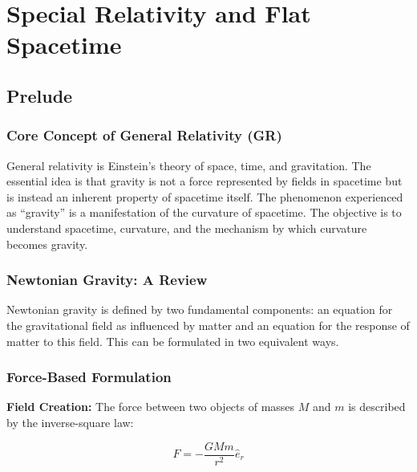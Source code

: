 \documentclass[11pt, a4paper]{report}
\begin{document}

\tableofcontents
\newpage

\chapter{Special Relativity and Flat Spacetime}

\section{Prelude}

\subsection*{Core Concept of General Relativity (GR)}

General relativity is Einstein's theory of space, time, and gravitation. The essential idea is that gravity is not a force represented by fields in spacetime but is instead an inherent property of spacetime itself. The phenomenon experienced as ``gravity'' is a manifestation of the curvature of spacetime. The objective is to understand spacetime, curvature, and the mechanism by which curvature becomes gravity.

\subsection*{Newtonian Gravity: A Review}

Newtonian gravity is defined by two fundamental components: an equation for the gravitational field as influenced by matter and an equation for the response of matter to this field. 
This can be formulated in two equivalent ways.
\subsection*{Force-Based Formulation}

\textbf{Field Creation:} The force between two objects of masses $M$ and $m$ is described by the inverse-square law:

\begin{equation}\label{eq:newton-force}
    F = - \frac{GMm}{r^2} \hat{e}_r
\end{equation}
\end{document}
